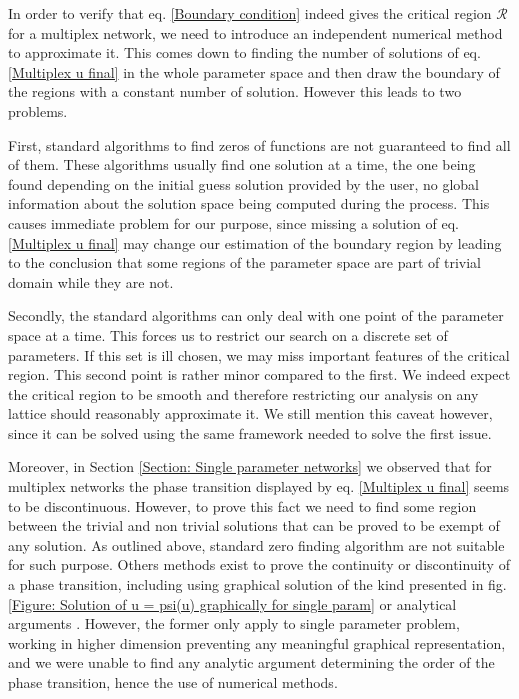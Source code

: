 \documentclass[
11pt, %
american, %
singlespacing, %
final, %
nolistspacing, %
liststotoc, %
headsepline, %
]{MastersDoctoralThesis} %
\begin{document}
In order to verify that eq. \eqref{Boundary condition} indeed gives the critical region $\mathcal{R}$ for a multiplex network, we need to introduce an independent numerical method to approximate it. This comes down to finding the number of solutions of eq. \eqref{Multiplex u final} in the whole parameter space and then draw the boundary of the regions with a constant number of solution. However this leads to two problems.

First, standard algorithms to find zeros of functions are not guaranteed to find all of them. These algorithms usually find one solution at a time, the one being found depending on the initial guess solution provided by the user, no global information about the solution space being computed during the process. This causes immediate problem for our purpose, since missing a solution of eq. \eqref{Multiplex u final} may change our estimation of the boundary region by leading to the conclusion that some regions of the parameter space are part of trivial domain while they are not.

Secondly, the standard algorithms can only deal with one point of the parameter space at a time. This forces us to restrict our search on a discrete set of parameters. If this set is ill chosen, we may miss important features of the critical region. This second point is rather minor compared to the first. We indeed expect the critical region to be smooth and therefore restricting our analysis on any lattice should reasonably approximate it. We still mention this caveat however, since it can be solved using the same framework needed to solve the first issue.

Moreover, in Section \ref{Section: Single parameter networks} we observed that for multiplex networks the phase transition displayed by eq. \eqref{Multiplex u final} seems to be discontinuous. However, to prove this fact we need to find some region between the trivial and non trivial solutions that can be proved to be exempt of any solution. As outlined above, standard zero finding algorithm are not suitable for such purpose. Others methods exist to prove the continuity or discontinuity of a phase transition, including using graphical solution of the kind presented in fig. \ref{Figure: Solution of u = psi(u) graphically for single param} \cite{son2012percolation} or analytical arguments \cite{baxter2012avalanche}. However, the former only apply to single parameter problem, working in higher dimension preventing any meaningful graphical representation, and we were unable to find any analytic argument determining the order of the phase transition, hence the use of numerical methods.
\end{document}
